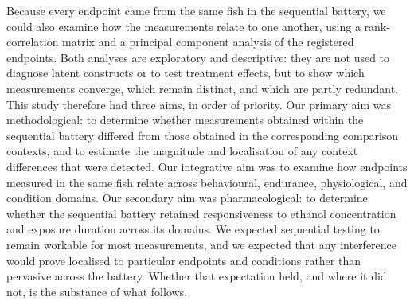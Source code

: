 \documentclass[12pt,a4paper]{article}
\begin{document}
Because every endpoint came from the same fish in the sequential battery, we could also examine how the measurements relate to one another, using a rank-correlation matrix and a principal component analysis of the registered endpoints. Both analyses are exploratory and descriptive: they are not used to diagnose latent constructs or to test treatment effects, but to show which measurements converge, which remain distinct, and which are partly redundant. This study therefore had three aims, in order of priority. Our primary aim was methodological: to determine whether measurements obtained within the sequential battery differed from those obtained in the corresponding comparison contexts, and to estimate the magnitude and localisation of any context differences that were detected. Our integrative aim was to examine how endpoints measured in the same fish relate across behavioural, endurance, physiological, and condition domains. Our secondary aim was pharmacological: to determine whether the sequential battery retained responsiveness to ethanol concentration and exposure duration across its domains. We expected sequential testing to remain workable for most measurements, and we expected that any interference would prove localised to particular endpoints and conditions rather than pervasive across the battery. Whether that expectation held, and where it did not, is the substance of what follows.
\end{document}
